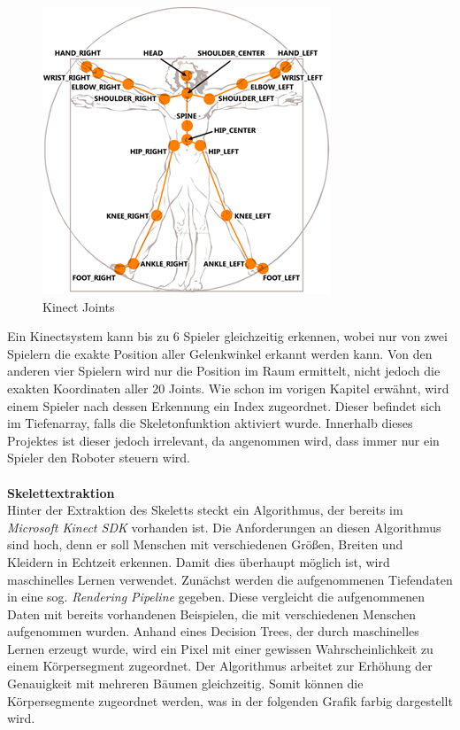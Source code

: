 \begin{figure}[H]						
	\centering							
	\includegraphics[scale=1.0]{Bilder/kinect_joints.png}			
	\caption{Kinect Joints \cite{ws:microsoft_jointType}}						
	\label{f:kinect_joints}						
\end{figure}

Ein Kinectsystem kann bis zu 6 Spieler gleichzeitig erkennen, wobei nur von zwei Spielern die exakte Position aller Gelenkwinkel erkannt werden kann. Von den anderen vier Spielern wird nur die Position im Raum ermittelt, nicht jedoch die exakten Koordinaten aller 20 Joints. Wie schon im vorigen Kapitel erwähnt, wird einem Spieler nach dessen Erkennung ein Index zugeordnet. Dieser befindet sich im Tiefenarray, falls die Skeletonfunktion aktiviert wurde. Innerhalb dieses Projektes ist dieser jedoch irrelevant, da angenommen wird, dass immer nur ein Spieler
den Roboter steuern wird.\\ \\

\textbf{Skelettextraktion}\\
Hinter der Extraktion des Skeletts steckt ein Algorithmus, der bereits im \textit{Microsoft Kinect SDK} vorhanden ist. 
Die Anforderungen an diesen Algorithmus sind hoch, denn er soll Menschen mit verschiedenen Größen,
Breiten und Kleidern in Echtzeit erkennen.
Damit dies überhaupt möglich ist, wird maschinelles Lernen verwendet. Zunächst werden die aufgenommenen Tiefendaten in eine sog. \textit{Rendering Pipeline}\cite{pdf:realtime_human_pose} gegeben. Diese vergleicht die aufgenommenen Daten mit bereits
vorhandenen Beispielen, die mit verschiedenen Menschen aufgenommen wurden. Anhand eines Decision Trees, der durch maschinelles Lernen erzeugt wurde, wird ein Pixel mit einer gewissen Wahrscheinlichkeit zu einem Körpersegment zugeordnet. Der Algorithmus arbeitet zur Erhöhung der Genauigkeit mit mehreren Bäumen gleichzeitig. Somit können die Körpersegmente zugeordnet werden, was in der folgenden Grafik farbig dargestellt wird.

